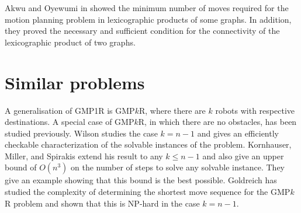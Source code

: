 \documentclass[12pt, a4paper]{article}
\theoremstyle{definition}
\begin{document}
Akwu and Oyewumi in \cite{akwu2018motion} showed the minimum number of moves required for the motion planning problem in lexicographic products of some graphs.
In addition, they proved the necessary and sufficient condition
for the connectivity of the lexicographic product of two graphs.

\section*{Similar problems}

A generalisation of GMP1R is GMP$k$R, where there are $k$ robots with respective destinations. A special case of GMP$k$R, in which there are no obstacles, has been studied previously. Wilson \cite{wilson1974graph} studies the case $k=n-1$  and gives an efficiently checkable characterization of the solvable instances of the problem. 
Kornhauser, Miller, and Spirakis \cite{kornhauser1984coordinating}
extend his result to any $k \leq n-1$ and also give an upper
bound of $O(n^3)$ on the number of steps to solve any solvable instance. They give an example showing that this bound is the best possible. 
Goldreich \cite{goldreich1984shortest} has studied the complexity of determining the shortest move sequence for the GMP$k$R problem
and shown that this is NP-hard in the case $k=n-1$.



\end{document}
